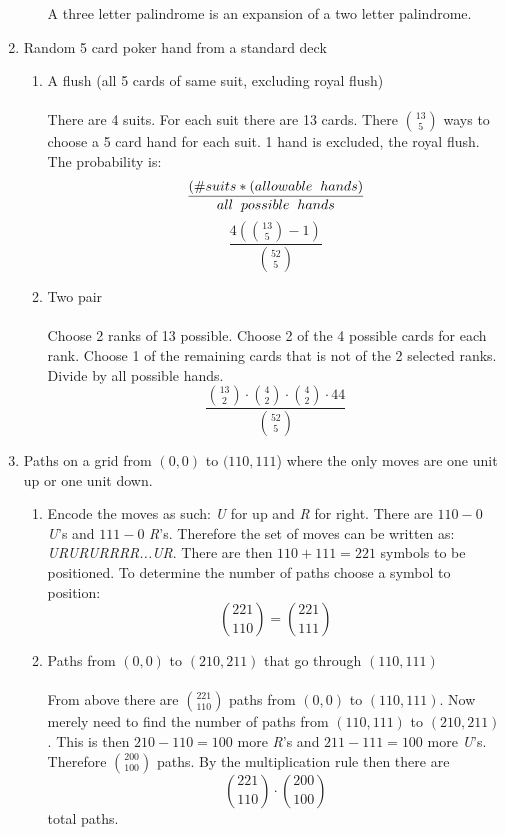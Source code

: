 \documentclass[11pt, oneside]{article}   	%
\begin{document}
\begin{enumerate}
\begin{enumerate}
			A three letter palindrome is an expansion of a two letter palindrome.
			\end{enumerate}
		\item Random 5 card poker hand from a standard deck
			\begin{enumerate}
				\item A flush (all 5 cards of same suit, excluding royal flush) \\\\
					There are 4 suits. For each suit there are 13 cards. There $\binom{13}{5}$ ways to choose a 5 card hand for each suit. 1 hand is excluded, the royal flush.\\
					The probability is: \[ \frac{(\# suits * ( allowable \hspace{2mm} hands )}{all \hspace{2mm} possible \hspace{2mm} hands} \]
					\[ \frac{4 (\binom{13}{5} - 1)}{\binom{52}{5}} \]
				\item Two pair \\\\
					Choose 2 ranks of 13 possible. Choose 2 of the 4 possible cards for each rank. Choose 1 of the remaining cards that is not of the 2 selected ranks. Divide by all possible hands.
					\[ \frac{\binom{13}{2} \cdot \binom{4}{2} \cdot \binom{4}{2} \cdot 44}{\binom{52}{5}} \]
			\end{enumerate}
		\item Paths on a grid from $(0, 0)$ to $(110, 111$) where the only moves are one unit up or one unit down.
			\begin{enumerate}
				\item Encode the moves as such: \textit{U} for up and \textit{R} for right. There are $110 - 0$ \textit{U}'s and $111 - 0$ \textit{R}'s. Therefore the set of moves can be written as: \textit{URURURRRR...UR}. There are then $110 + 111 = 221$ symbols to be
				positioned. To determine the number of paths choose a symbol to position: \[ \binom{221}{110} = \binom{221}{111} \]
				\item Paths from $(0, 0)$ to $(210, 211)$ that go through $(110, 111)$ \\\\
				From above there are $\binom{221}{110}$ paths from $(0, 0)$ to $(110, 111)$. Now merely need to find the number of paths from $(110, 111)$ to $(210, 211)$. This is then $210 - 110 = 100$ more \textit{R}'s and $211 - 111 = 100$ more \textit{U}'s.
				Therefore $\binom{200}{100}$ paths. By the multiplication rule then there are \[ \binom{221}{110} \cdot \binom{200}{100} \] total paths.

\end{enumerate}
\end{enumerate}
\end{document}
